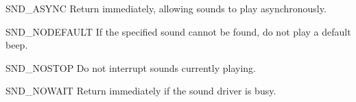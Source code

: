 \begin{datadesc}{SND_ASYNC}
  Return immediately, allowing sounds to play asynchronously.
\end{datadesc}

\begin{datadesc}{SND_NODEFAULT}
  If the specified sound cannot be found, do not play a default beep.
\end{datadesc}

\begin{datadesc}{SND_NOSTOP}
  Do not interrupt sounds currently playing.
\end{datadesc}

\begin{datadesc}{SND_NOWAIT}
  Return immediately if the sound driver is busy.
\end{datadesc}

